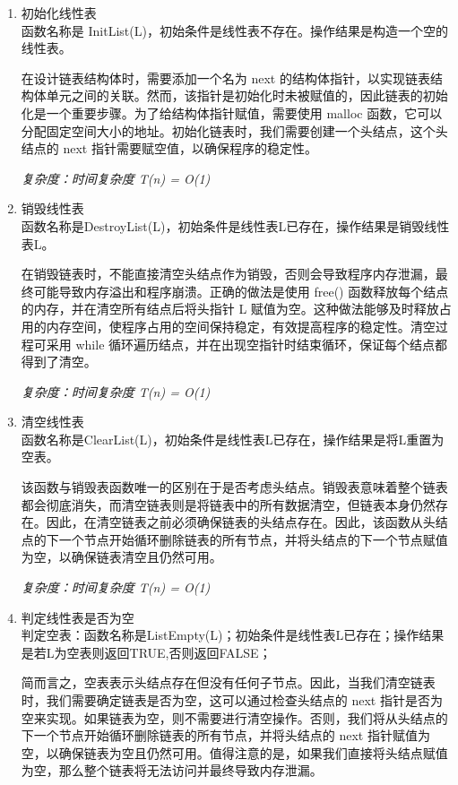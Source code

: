 \documentclass[supercite]{Experimental_Report}
\theoremstyle{definition}
\begin{document}
\begin{enumerate}
	\item 初始化线性表\\
	函数名称是 InitList(L)，初始条件是线性表不存在。操作结果是构造一个空的线性表。
	
	在设计链表结构体时，需要添加一个名为 next 的结构体指针，以实现链表结构体单元之间的关联。然而，该指针是初始化时未被赋值的，因此链表的初始化是一个重要步骤。为了给结构体指针赋值，需要使用 malloc 函数，它可以分配固定空间大小的地址。初始化链表时，我们需要创建一个头结点，这个头结点的 next 指针需要赋空值，以确保程序的稳定性。
	
	\emph{复杂度：时间复杂度 T(n) = O(1)}
	\item 销毁线性表\\
	函数名称是DestroyList(L)，初始条件是线性表L已存在，操作结果是销毁线性表L。
	
	在销毁链表时，不能直接清空头结点作为销毁，否则会导致程序内存泄漏，最终可能导致内存溢出和程序崩溃。正确的做法是使用 free() 函数释放每个结点的内存，并在清空所有结点后将头指针 L 赋值为空。这种做法能够及时释放占用的内存空间，使程序占用的空间保持稳定，有效提高程序的稳定性。清空过程可采用 while 循环遍历结点，并在出现空指针时结束循环，保证每个结点都得到了清空。
	
	\emph{复杂度：时间复杂度 T(n) = O(1)}
	\item 清空线性表\\
	函数名称是ClearList(L)，初始条件是线性表L已存在，操作结果是将L重置为空表。
	
	该函数与销毁表函数唯一的区别在于是否考虑头结点。销毁表意味着整个链表都会彻底消失，而清空链表则是将链表中的所有数据清空，但链表本身仍然存在。因此，在清空链表之前必须确保链表的头结点存在。因此，该函数从头结点的下一个节点开始循环删除链表的所有节点，并将头结点的下一个节点赋值为空，以确保链表清空且仍然可用。
	
	\emph{复杂度：时间复杂度 T(n) = O(1)}
	\item 判定线性表是否为空\\
	判定空表：函数名称是ListEmpty(L)；初始条件是线性表L已存在；操作结果是若L为空表则返回TRUE,否则返回FALSE；
	
	简而言之，空表表示头结点存在但没有任何子节点。因此，当我们清空链表时，我们需要确定链表是否为空，这可以通过检查头结点的 next 指针是否为空来实现。如果链表为空，则不需要进行清空操作。否则，我们将从头结点的下一个节点开始循环删除链表的所有节点，并将头结点的 next 指针赋值为空，以确保链表为空且仍然可用。值得注意的是，如果我们直接将头结点赋值为空，那么整个链表将无法访问并最终导致内存泄漏。
	

\end{enumerate}
\end{document}
